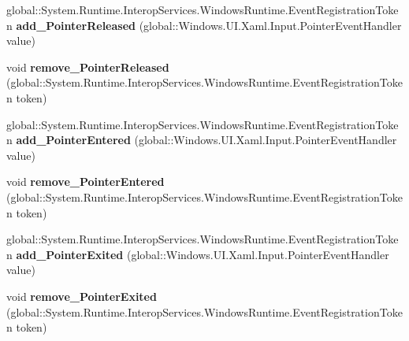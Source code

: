 \begin{DoxyCompactItemize}
\item 
\mbox{\label{interface_windows_1_1_u_i_1_1_xaml_1_1_i_u_i_element_ab3b709a6be4af0f8547f52d2157bd763}} 
global\+::\+System.\+Runtime.\+Interop\+Services.\+Windows\+Runtime.\+Event\+Registration\+Token {\bfseries add\+\_\+\+Pointer\+Released} (global\+::\+Windows.\+U\+I.\+Xaml.\+Input.\+Pointer\+Event\+Handler value)
\item 
\mbox{\label{interface_windows_1_1_u_i_1_1_xaml_1_1_i_u_i_element_abd23ebff773fb5a9158d2ee59097988e}} 
void {\bfseries remove\+\_\+\+Pointer\+Released} (global\+::\+System.\+Runtime.\+Interop\+Services.\+Windows\+Runtime.\+Event\+Registration\+Token token)
\item 
\mbox{\label{interface_windows_1_1_u_i_1_1_xaml_1_1_i_u_i_element_a54194f94b331caa84198af8f0147c1f1}} 
global\+::\+System.\+Runtime.\+Interop\+Services.\+Windows\+Runtime.\+Event\+Registration\+Token {\bfseries add\+\_\+\+Pointer\+Entered} (global\+::\+Windows.\+U\+I.\+Xaml.\+Input.\+Pointer\+Event\+Handler value)
\item 
\mbox{\label{interface_windows_1_1_u_i_1_1_xaml_1_1_i_u_i_element_a97fd59b642c8546d197cd5ffebe213bf}} 
void {\bfseries remove\+\_\+\+Pointer\+Entered} (global\+::\+System.\+Runtime.\+Interop\+Services.\+Windows\+Runtime.\+Event\+Registration\+Token token)
\item 
\mbox{\label{interface_windows_1_1_u_i_1_1_xaml_1_1_i_u_i_element_a692d43ef89399af622b349c4c0ac5249}} 
global\+::\+System.\+Runtime.\+Interop\+Services.\+Windows\+Runtime.\+Event\+Registration\+Token {\bfseries add\+\_\+\+Pointer\+Exited} (global\+::\+Windows.\+U\+I.\+Xaml.\+Input.\+Pointer\+Event\+Handler value)
\item 
\mbox{\label{interface_windows_1_1_u_i_1_1_xaml_1_1_i_u_i_element_a934eefa2b5181fd9b0c19d7b6536d6d9}} 
void {\bfseries remove\+\_\+\+Pointer\+Exited} (global\+::\+System.\+Runtime.\+Interop\+Services.\+Windows\+Runtime.\+Event\+Registration\+Token token)
\item 

\end{DoxyCompactItemize}
